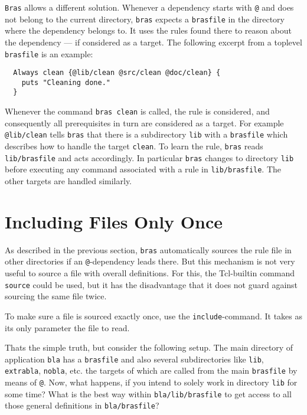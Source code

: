 \documentclass[12pt]{article}
\newcommand{\bras}{\texttt{bras}}
\newcommand{\Bras}{\texttt{Bras}}
\begin{document}
\Bras{} allows a different solution. Whenever a dependency starts with
\texttt{@} and does not belong to the current directory, \bras{} expects
a \texttt{brasfile} in the directory where the dependency belongs
to. It uses the rules found there to reason about the dependency ---
if considered as a target.  The following excerpt from a
toplevel \texttt{brasfile} is an example:

\begin{verbatim}
  Always clean {@lib/clean @src/clean @doc/clean} {
    puts "Cleaning done."
  }
\end{verbatim}

Whenever the command \texttt{bras clean}
is called, the rule is considered, and consequently all
prerequisites in turn are considered as a target. For example
\texttt{@lib/clean} tells \bras{} that there is a subdirectory
\texttt{lib} with a \texttt{brasfile} which
describes how to handle the target \texttt{clean}. To learn
the rule, \bras{} reads \texttt{lib/bras\-file} and acts accordingly.
In particular \bras{} changes to directory \texttt{lib}
before executing any command associated with a rule in
\texttt{lib/brasfile}. The other targets are handled similarly.

\section{Including Files Only Once}

As described in the previous section, \bras{} automatically sources
the rule file in other directories if an \texttt{@}-dependency leads
there. But this mechanism is not very useful to source a file with
overall definitions. For this, the Tcl-builtin command
\texttt{source} could be used, but it has the disadvantage that it
does not guard against sourcing the same file twice.

To make sure a file is sourced exactly once, use the
\texttt{include}-command. It takes as its only parameter the file to
read. 

Thats the simple truth, but consider the following setup. The main
directory of application \texttt{bla} has a \texttt{brasfile} and also
several subdirectories like \texttt{lib}, \texttt{extrabla},
\texttt{nobla}, etc. the targets of which are called from the main
\texttt{brasfile} by means of \texttt{@}. Now, what happens,
if you intend to solely work in directory \texttt{lib} for some time?
What is the best way within \texttt{bla/lib/brasfile} to get access to all
those general definitions in \texttt{bla/brasfile}?
\end{document}

